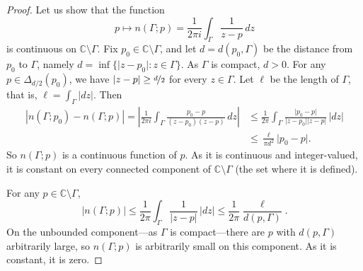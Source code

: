 \documentclass[12pt,openany]{book}
\newcommand{\glsadd}[2][]{}
\newcommand{\sabs}[1]{\lvert {#1} \rvert}
\newcommand{\abs}[1]{\left\lvert {#1} \right\rvert}
\newcommand{\C}{{\mathbb{C}}}
\theoremstyle{plain}
\theoremstyle{remark}
\theoremstyle{definition}
\theoremstyle{exercise}
\theoremstyle{example}
\begin{document}
\begin{proof}
Let us show that the function
\begin{equation*}
p \mapsto n(\Gamma;p) = \frac{1}{2\pi i} \int_\Gamma \frac{1}{z-p} \, dz
\end{equation*}
is continuous on $\C \setminus \Gamma$.
Fix $p_0 \in \C \setminus \Gamma$, and let
\glsadd{not:distancetoset}%
$d = d(p_0,\Gamma)$ be the
distance from 
$p_0$ to $\Gamma$, namely
$d = \inf \bigl\{ \sabs{z-p_0} : z \in \Gamma \bigr\}$.
As $\Gamma$ is compact, $d > 0$.  
For any $p \in \Delta_{d/2}(p_0)$, we have $\sabs{z-p} \geq
\nicefrac{d}{2}$ for every $z \in \Gamma$.  Let $\ell$ be the length of
$\Gamma$, that is, $\ell = \int_\Gamma \sabs{dz}$.  Then
\begin{equation*}
\begin{split}
\abs{n(\Gamma;p_0)-n(\Gamma;p)}
=
\abs{\frac{1}{2\pi i} \int_\Gamma \frac{p_0-p}{(z-p_0)(z-p)} \, dz}
& \leq
\frac{1}{2\pi} \int_\Gamma \frac{\sabs{p_0-p}}{\sabs{z-p_0}\sabs{z-p}} \, \sabs{dz}
\\
& \leq 
\frac{\ell}{\pi {d}^2} \sabs{p_0-p} .
\end{split}
\end{equation*}
So $n(\Gamma;p)$ is a continuous function of $p$.
As it is continuous
and integer-valued, it is constant on every connected component of
$\C \setminus \Gamma$ (the set where it is defined).

For any $p \in \C \setminus \Gamma$,
\begin{equation*}
\sabs{n(\Gamma;p)} \leq \frac{1}{2\pi} \int_\Gamma \frac{1}{\sabs{z-p}} \,
\sabs{dz} \leq \frac{1}{2\pi} \frac{\ell}{d(p,\Gamma)} .
\end{equation*}
On the unbounded component---as $\Gamma$ is compact---there are $p$
with $d(p,\Gamma)$ arbitrarily large, so $n(\Gamma;p)$ is arbitrarily small
on this component.  As it is constant, it is zero.
\end{proof}
\end{document}

